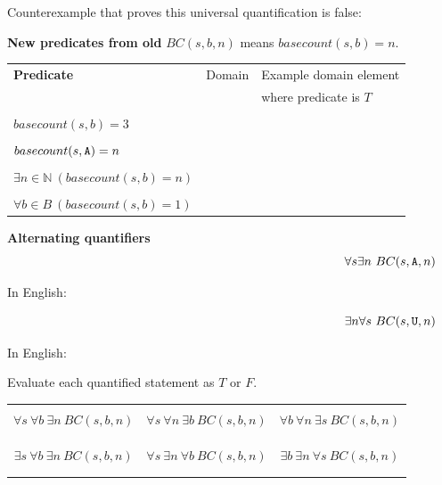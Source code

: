 \documentclass[12pt, oneside]{article}
\begin{document}
Counterexample that proves this universal quantification is false: \underline{\phantom{$(\G\G, \A, 2)$ or $(\G\A\U\G, \G, 3)$)}}


{\bf New predicates from old} \qquad $BC(s,b,n)$ means $basecount(s,b) = n$.
\begin{center}
\begin{tabular}{|p{2.5in}p{1.5in}p{2in}|}
\hline
{\bf Predicate} & Domain &  Example domain element \\
& & where predicate is $T$\\
\hline
&& \\
$basecount(s,b) = 3$ & \phantom{$S \times B$}& 
\phantom{$(\A\U\A\A, \A)$}\\
\hline
&& \\
$basecount(s,\texttt{A}) = n $&\phantom{$S \times \mathbb{N}$} & 
\phantom{$(\A\U\A,2)$}\\
\hline
&& \\
$\exists n \in \mathbb{N} ~(basecount(s,b) = n) $&\phantom{$S \times \mathbb{N}$} & 
\phantom{$(\A\U\A,2)$}\\
\hline
&& \\
$\forall b \in B ~(basecount(s,b) = 1) $&\phantom{$S$} & 
\phantom{$\A\C\G\U$}\\
\hline
\end{tabular}
\end{center}


{\bf Alternating quantifiers}
$$\forall s \exists n ~BC(s,\texttt{A},n)$$

In English: \underline{\phantom{\hspace{3in}}}

\vfill

$$\exists n \forall s ~BC(s,\texttt{U},n)$$

In English: \underline{\phantom{\hspace{3in}}}


\vfill

Evaluate each quantified statement as $T$ or $F$.

\vspace{-20pt}

\begin{center}
\begin{tabular}{|c|c|c|}
\hline
&&\\
$\forall s ~\forall b ~\exists n~BC(s,b,n)$ & $\forall s ~\forall n ~ \exists b~BC(s,b,n)$ & $\forall b ~\forall n ~\exists s~BC(s,b,n)$ \\
&&\\
&&\\
\hline
&&\\
$\exists s ~\forall b ~\exists n~BC(s,b,n)$ & $\forall s~ \exists n ~\forall b~BC(s,b,n)$ & $\exists b ~\exists n ~\forall s~BC(s,b,n)$ \\
&&\\
&&\\
\hline
\end{tabular}
\end{center}
\end{document}
